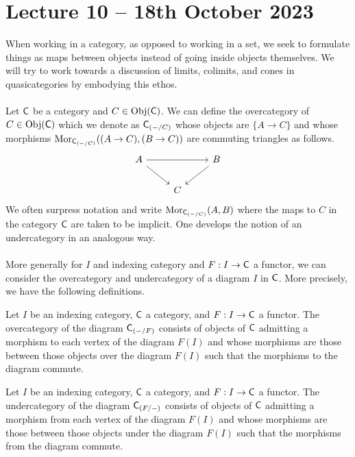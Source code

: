 \section{Lecture 10 -- 18th October 2023}
When working in a category, as opposed to working in a set, we seek to formulate things as maps between objects instead of going inside objects themselves. We will try to work towards a discussion of limits, colimits, and cones in quasicategories by embodying this ethos. 
\\\\
Let $\mathsf{C}$ be a category and $C\in\mathrm{Obj}(\mathsf{C})$. We can define the overcategory of $C\in\mathrm{Obj}(\mathsf{C})$ which we denote as $\mathsf{C}_{(-/C)}$ whose objects are $\{A\to C\}$ and whose morphisms $\mathrm{Mor}_{\mathsf{C}_{(-/C)}}((A\to C), (B\to C))$ are commuting triangles as follows.
$$%
\begin{tikzcd}
	A && B \\
	& C
	\arrow[from=1-1, to=1-3]
	\arrow[from=1-3, to=2-2]
	\arrow[from=1-1, to=2-2]
\end{tikzcd}$$
We often surpress notation and write $\mathrm{Mor}_{\mathsf{C}_{(-/C)}}(A,B)$ where the maps to $C$ in the category $\mathsf{C}$ are taken to be implicit. One develops the notion of an undercategory in an analogous way. \\\\
More generally for $I$ and indexing category and $F:I\to \mathsf{C}$ a functor, we can consider the overcategory and undercategory of a diagram $I$ in $\mathsf{C}$. More precisely, we have the following definitions. 
\begin{definition}[Overcategory]
  Let $I$ be an indexing category, $\mathsf{C}$ a category, and $F:I\to \mathsf{C}$ a functor. The overcategory of the diagram $\mathsf{C}_{(-/F)}$ consists of objects of $\mathsf{C}$ admitting a morphism to each vertex of the diagram $F(I)$ and whose morphisms are those between those objects over the diagram $F(I)$ such that the morphisms to the diagram commute. 
\end{definition}
\begin{definition}[Undercategory]
  Let $I$ be an indexing category, $\mathsf{C}$ a category, and $F:I\to \mathsf{C}$ a functor. The undercategory of the diagram $\mathsf{C}_{(F/-)}$ consists of objects of $\mathsf{C}$ admitting a morphism from each vertex of the diagram $F(I)$ and whose morphisms are those between those objects under the diagram $F(I)$ such that the morphisms from the diagram commute. 
\end{definition}
